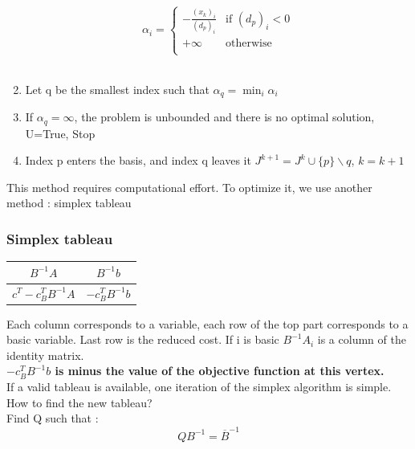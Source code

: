 \documentclass[../main.tex]{subfiles}
\begin{document}
\begin{enumerate}
\begin{equation}
        \alpha_i = \begin{cases}
            -\frac{(x_k)_i}{(d_p)_i} & \text{if } (d_p)_i < 0\\
            +\infty & \text{otherwise}\\
        \end{cases}
    \end{equation}\\
    \item Let q be the smallest index such that $\alpha_q = \min_i \alpha_i$\\
    \item If $\alpha_q = \infty$, the problem is unbounded and there is no optimal solution, U=True, Stop\\
    \item Index p enters the basis, and index q leaves it $J^{k+1} = J^k \cup \{p\} \backslash q $, $k = k+1$\\
\end{enumerate}



This method requires computational effort. To optimize it, we use another method : simplex tableau\\

\subsubsection{Simplex tableau}
\begin{table}[hbt!]
    \centering
    \begin{tabular}{|c|c|}
       \hline
        $B^{-1}A$ & $B^{-1}b$\\
        \hline
        $c^T-c_B^TB^{-1}A$ & $-c^T_B B^{-1}b$\\
        \hline
    \end{tabular}
\end{table}
Each column corresponds to a variable, each row of the top part corresponds to a basic variable. Last row is the reduced cost. If i is basic $B^{-1}A_i$ is a column of the identity matrix.\\
\textbf{$-c_B^TB^{-1}b$ is minus the value of the objective function at this vertex.}\\

If a valid tableau is available, one iteration of the simplex algorithm is simple. \\

How to find the new tableau? \\
Find Q such that : \begin{equation}
    QB^{-1} = \overline{B}^{-1}
\end{equation}
\end{document}
